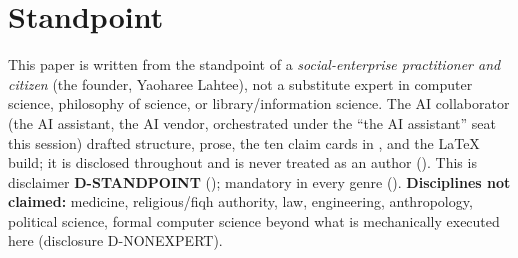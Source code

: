 \documentclass[11pt]{article}
\begin{document}
\section{Standpoint}
\label{sec:standpoint}
This paper is written from the standpoint of a \emph{social-enterprise practitioner and citizen}
(the founder, Yaoharee Lahtee), not a substitute expert in computer science, philosophy of
science, or library/information science. The AI collaborator (the AI assistant, the AI vendor, orchestrated
under the ``the AI assistant'' seat this session) drafted structure, prose, the ten claim cards in
, and the LaTeX build; it is disclosed throughout and is never treated as
an author (). This is disclaimer \textbf{D-STANDPOINT}
(); mandatory in every genre (). \textbf{Disciplines not
claimed:} medicine, religious/fiqh authority, law, engineering, anthropology, political science,
formal computer science beyond what is mechanically executed here (disclosure D-NONEXPERT).
\end{document}
